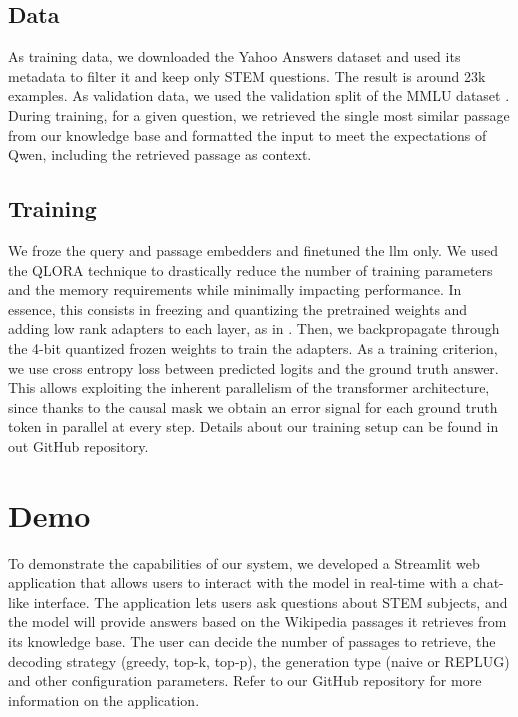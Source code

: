 \documentclass[11pt]{article}
\begin{document}
\subsection{Data}

As training data, we downloaded the Yahoo Answers dataset and used its metadata to filter it and keep only STEM questions. The result is around 23k
examples. As validation data, we used the validation split of the MMLU dataset \cite{mmlu_hf}. During training, for a given question, we retrieved the single most similar passage from
our knowledge base and formatted the input to meet the expectations of Qwen, including the retrieved passage as context.

\subsection{Training}

We froze the query and passage embedders and finetuned the llm only. We used the QLORA technique \cite{qlora} to drastically reduce the number of training
parameters and the memory requirements while minimally impacting performance. In essence, this consists in freezing and quantizing the pretrained weights and adding low
rank adapters to each layer, as in \cite{lora}. Then, we backpropagate through the 4-bit quantized frozen weights to train the adapters.
As a training criterion, we use cross entropy loss between predicted logits and the ground truth answer. This allows exploiting the inherent
parallelism of the transformer architecture, since thanks to the causal mask we obtain an error signal for each ground truth token in parallel at every step.
Details about our training setup can be found in out GitHub repository.

\section{Demo}

To demonstrate the capabilities of our system, we developed a Streamlit web application
that allows users to interact with the model in real-time with a chat-like interface. 
The application lets users ask questions about STEM subjects, and the model will provide answers 
based on the Wikipedia passages it retrieves from its knowledge base. 
The user can decide the number of passages to retrieve, the decoding strategy (greedy, top-k, top-p), 
the generation type (naive or REPLUG) and other configuration parameters.
Refer to our GitHub repository for more information on the application.
\end{document}
